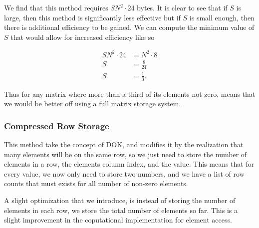 \documentclass[../fem.tex]{subfiles}
\begin{document}
We find that this method requires $SN^2\cdot24$ bytes. It is clear to see that
if $S$ is large, then this method is significantly less effective but if $S$ is
small enough, then there is additional efficiency to be gained. We can compute
the minimum value of $S$ that would allow for increased efficiency like so

\begin{align*}
  SN^2\cdot24&=N^2\cdot8\\
  S&=\frac{8}{24}\\
  S&=\frac{1}{3}.
\end{align*}

Thus for any matrix where more than a third of its elements not zero, means
that we would be better off using a full matrix storage system.

\begin{Figure}
  \begin{center}
  \end{center}
  \label{fig:mat_dok}
\end{Figure}

\subsubsection{Compressed Row Storage}%
\label{ssub:compressed_row_storage}

This method take the concept of DOK, and modifies it by the realization that
many elements will be on the same row, so we just need to store the number of
elements in a row, the elements column index, and the value. This means that
for every value, we now only need to store two numbers, and we have a list of
row counts that must exists for all number of non-zero elements.

A slight optimization that we introduce, is instead of storing the number of
elements in each row, we store the total number of elements so far. This is a
slight improvement in the coputational implementation for element access.
\end{document}
